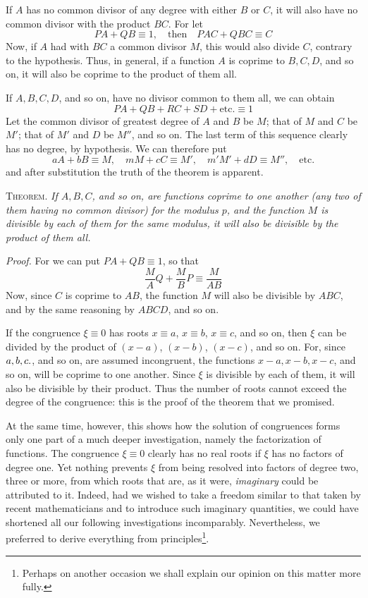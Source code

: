 If $A$ has no common divisor of any degree with either $B$ or $C$, it will also have no common divisor with the product $BC$. For let
\[
PA+QB\equiv1,\quad\text{then}\quad PAC+QBC\equiv C
\]
Now, if $A$ had with $BC$ a common divisor $M$, this would also divide $C$, contrary to the hypothesis. Thus, in general, if a function $A$ is coprime to $B,C,D$, and so on, it will also be coprime to the product of them all.

If $A,B,C,D$, and so on, have no divisor common to them all, we can obtain
\[
PA+QB+RC+SD+\text{etc.}\equiv1
\]
Let the common divisor of greatest degree of $A$ and $B$ be $M$; that of $M$ and $C$ be $M'$; that of $M'$ and $D$ be $M''$, and so on. The last term of this sequence clearly has no degree, by hypothesis. We can therefore put
\[
aA+bB\equiv M,\quad mM+cC\equiv M',\quad m'M'+dD\equiv M'',\quad\text{etc.}
\]
and after substitution the truth of the theorem is apparent.

\textsc{Theorem.} \emph{If $A,B,C$, and so on, are functions coprime to one another (any two of them having no common divisor) for the modulus $p$, and the function $M$ is divisible by each of them for the same modulus, it will also be divisible by the product of them all.}

\emph{Proof.} For we can put $PA+QB\equiv1$, so that
\[
\frac MA Q+\frac MB P\equiv\frac M{AB}
\]
Now, since $C$ is coprime to $AB$, the function $M$ will also be divisible by $ABC$, and by the same reasoning by $ABCD$, and so on.

If the congruence $\xi\equiv0$ has roots $x\equiv a$, $x\equiv b$, $x\equiv c$, and so on, then $\xi$ can be divided by the product of $(x-a)$, $(x-b)$, $(x-c)$, and so on. For, since $a,b,c\mathbin{.}$, and so on, are assumed incongruent, the functions $x-a,x-b,x-c$, and so on, will be coprime to one another. Since $\xi$ is divisible by each of them, it will also be divisible by their product. Thus the number of roots cannot exceed the degree of the congruence: this is the proof of the theorem that we promised.

At the same time, however, this shows how the solution of congruences forms only one part of a much deeper investigation, namely the factorization of functions. The congruence $\xi\equiv0$ clearly has no real roots if $\xi$ has no factors of degree one. Yet nothing prevents $\xi$ from being resolved into factors of degree two, three or more, from which roots that are, as it were, \emph{imaginary} could be attributed to it. Indeed, had we wished to take a freedom similar to that taken by recent mathematicians and to introduce such imaginary quantities,
we could have shortened all our following investigations incomparably. Nevertheless, we preferred to derive everything from principles\begingroup\renewcommand{\thefootnote}{*)}\footnote{Perhaps on another occasion we shall explain our opinion on this matter more fully.}\endgroup.

